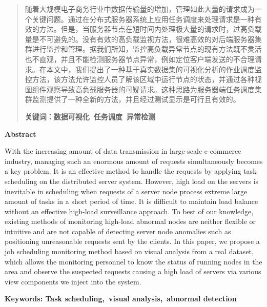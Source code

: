 \begin{abstract}
	 随着大规模电子商务行业中数据传输量的增加，管理如此大量的请求成为一个关键问题。通过在分布式服务器系统上应用任务调度来处理请求是一种有效的方法。但是，当服务器节点在短时间内处理极大量的请求时，过高负载量是不可避免的。没有有效的高负载监视方法，很难高效的对后端服务器集群进行监控和管理。据我们所知，监控高负载异常节点的现有方法既不灵活也不直观，并且不能检测服务器节点异常，例如定位客户端发送的不合理请求。在本文中，我们提出了一种基于真实数据集的可视化分析的作业调度监控方法，该方法允许监控人员了解该区域中运行节点的状态，并通过各种视图组件观察导致高负载服务器的可疑请求。这种思路为服务器端任务调度集群监测提供了一种全新的方法，并且经过测试显示是可行且有效的。
	
	\textbf{关键词：数据可视化\ 任务调度\ 异常检测}
	
\end{abstract}

\thispagestyle{empty} 
\newpage

\begin{center}
	\large{\textbf{Abstract}}
\end{center}

With the increasing amount of data transmission in large-scale e-commerce industry, managing such an enormous amount of requests simultaneously becomes a key problem. It is an effective method to handle the requests by applying task scheduling on the distributed server system. However, high load on the servers is inevitable in scheduling when requests of a server node process extreme large amount of tasks in a short period of time. It is difficult to maintain load balance without an effective high-load surveillance approach. To best of our knowledge, existing methods of monitoring high-load abnormal nodes are neither flexible or intuitive and are not capable of detecting server node anomalies such as positioning unreasonable requests sent by the clients. In this paper, we propose a job scheduling monitoring method based on visual analysis from a real dataset, which allows the monitoring personnel to know the status of running nodes in the area and observe the suspected requests causing a high load of servers via various view components we inject into the system.

\textbf{Keywords: Task scheduling,\ visual analysis,\ abnormal detection}

\thispagestyle{empty}

\newpage
\setcounter{page}{1}        %